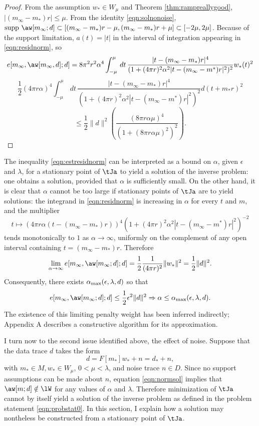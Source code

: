 \begin{proof}
  From the assumption $w_* \in W_{\mu}$ and Theorem
  \ref{thm:rampreallygood}, $|(m_{\infty}-m_*)r|\le \mu$. From the
  identity \ref{eqn:solnonoise},
  $\mbox{supp }\aw[m_{\infty};d] \subset
  [(m_{\infty}-m_*)r-\mu,(m_{\infty}-m_*)r+\mu] \subset
  [-2\mu,2\mu]$. Because of the support limitation, $a(t)=|t|$ in the
  interval of integration appearing in \ref{eqn:residnorm}, so
\[
  e[m_{\infty},\aw[m_{\infty},d];d] 
= 8 \pi^2 r^2 \alpha^4\int^{\mu}_{-\mu}\,dt\,\frac{|t-(m_{\infty}-m_*)r|^4}{(1+(4\pi r)^2 \alpha^2 
|t-(m_{\infty}-m^*)r|^2)^{2}}w_*(t)^2
\]
\[
  \frac{1}{2} (4\pi r \alpha)^4\int^{\mu}_{-\mu}\,dt\,\frac{|t-(m_{\infty}-m_*)r|^4}{(1+(4\pi r)^2 \alpha^2 
|t-(m_{\infty}-m^*)r|^2)^{2}}d(t+m_*r)^2
\]
\[
  \le \frac{1}{2} \|d\|^2  \left(\frac{(8\pi r \alpha \mu)^4}{(1+(8\pi
      r \alpha \mu)^2)^2}\right).
  \]
\end{proof}

The inequality \ref{eqn:estresidnorm} can be interpreted as a bound 
on $\alpha$, given $\epsilon$ and $\lambda$, for a
stationary point of $\tJa$ to yield a solution of the inverse
problem: one obtains a solution, provided that $\alpha$ is
sufficiently small. On the other hand, it is clear that $\alpha$
cannot be too large if stationary points of $\tJa$ are to yield
solutions: the integrand in \ref{eqn:residnorm} is increasing in
$\alpha$ for every $t$ and $m$, and the multiplier
\[
t \mapsto (4\pi r \alpha(t-(m_{\infty}-m_*)r))^4(1+(4\pi r)^2 \alpha^2 
|t-(m_{\infty}-m^*)r|^2)^{-2}
\]
tends monotonically to $1$ as $\alpha \rightarrow \infty$, uniformly
on the complement of any open interval containing
$t=(m_{\infty}-m_*)r$. Therefore
\begin{equation}
  \label{eqn:elimit}
  \lim_{\alpha \rightarrow \infty}e[m_{\infty},\aw[m_{\infty};d];d] =
  \frac{1}{2}\frac{1}{(4 \pi r)^2}\|w_*\|^2 = \frac{1}{2}\|d\|^2.
\end{equation}
Consequently, there exists $\alpha_{\rm max}(\epsilon,\lambda,d)$ so
that
\[
  e[m_{\infty},\aw[m_{\infty};d];d]  \le \frac{1}{2}\epsilon^2\|d\|^2
  \Rightarrow \alpha \le \alpha_{\rm max}(\epsilon,\lambda,d).
\]
The existence of this limiting penalty weight has been inferred
indirectly; Appendix A describes a constructive algorithm
for its approximation.

I turn now to the second issue identified above, the effect of
noise. Suppose that the data trace $d$ takes the form
\begin{equation}
  \label{eqn:defdatanoisy}
  d = F[m_*]w_* + n = d_*+n,
\end{equation}
with $m_* \in M, w_* \in W_{\mu}$, $0<\mu<\lambda$, and noise trace $n \in
D$. Since no support assumptions can be made about $n$, equation
\ref{eqn:normsol} implies that $\aw[m;d] \notin \lW$ for any values of
$\alpha$ and $\lambda$.  Therefore minimization of $\tJa$ cannot by itself yield a
solution of the inverse problem as defined in the problem statement
\ref{eqn:probstat0}. In this section, I explain how a solution may
nontheless be constructed from a stationary point of $\tJa$.

